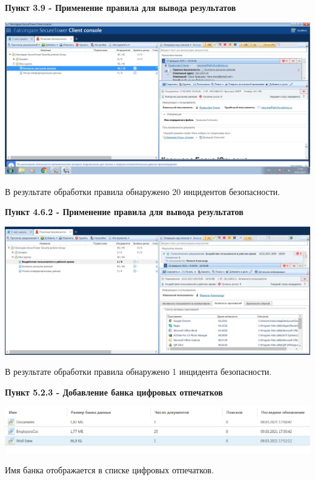 \documentclass[a4paper,14pt]{extarticle}
\begin{document}
    \textbf{Пункт 3.9 - Применение правила для вывода результатов}
    \begin{center}
        \includegraphics[scale=0.25]{pics/3.9.jpg}

        В результате обработки правила обнаружено 20 инцидентов
        безопасности.
    \end{center}

    \textbf{Пункт 4.6.2 - Применение правила для вывода результатов} 
    \begin{center}
        \includegraphics[scale=0.25]{pics/4.6.2.jpg}

        В результате обработки правила обнаружено 1 инцидента безопасности. 
    \end{center}

    \textbf{Пункт 5.2.3 - Добавление банка цифровых отпечатков}
    \begin{center}
        \includegraphics[scale=0.25]{pics/5.2.3.jpg}

        Имя банка отображается в списке цифровых отпечатков.
   \end{center}
\end{document}
